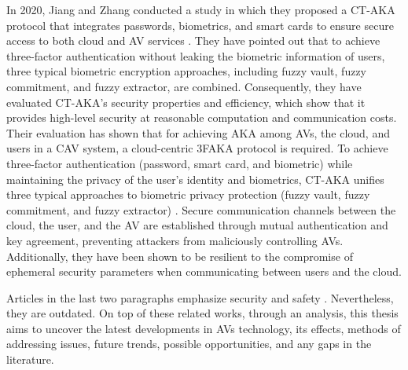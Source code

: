 \documentclass[a4paper,12pt]{article}
\begin{document}
In 2020, Jiang and Zhang conducted a study in which they proposed a CT-AKA protocol that integrates passwords, biometrics, and smart cards to ensure secure access to both cloud and AV services \cite{s20}. They have pointed out that to achieve three-factor authentication without leaking the biometric information of users, three typical biometric encryption approaches, including fuzzy vault, fuzzy commitment, and fuzzy extractor, are combined. Consequently, they have evaluated CT-AKA's security properties and efficiency, which show that it provides high-level security at reasonable computation and communication costs. Their evaluation has shown that for achieving AKA among AVs, the cloud, and users in a CAV system, a cloud-centric 3FAKA protocol is required. To achieve three-factor authentication (password, smart card, and biometric) while maintaining the privacy of the user's identity and biometrics, CT-AKA unifies three typical approaches to biometric privacy protection (fuzzy vault, fuzzy commitment, and fuzzy extractor) \cite{s20}. Secure communication channels between the cloud, the user, and the AV are established through mutual authentication and key agreement, preventing attackers from maliciously controlling AVs. Additionally, they have been shown to be resilient to the compromise of ephemeral security parameters when communicating between users and the cloud.\par 

Articles in the last two paragraphs emphasize security and safety \cite{article6} \cite{s20}. Nevertheless, they are outdated. On top of these related works,  through an analysis, this thesis aims to uncover the latest developments in AVs technology, its effects, methods of addressing issues, future trends, possible opportunities, and any gaps in the literature.
\end{document}
